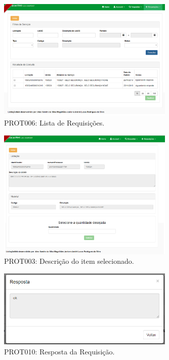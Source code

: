\begin{figure}[htp]
	\centering
	\includegraphics[width=0.75\textwidth]{figuras/prototipo006.png}
	\caption[PROT006: Lista de Requisições]{PROT006: Lista de Requisições.}
	\label{tela02}
\end{figure}

\begin{figure}[htp]
	\centering
	\includegraphics[width=0.75\textwidth]{figuras/prototipo003.png}
	\caption[PROT003: Descrição do item selecionado]{PROT003: Descrição do item selecionado.}
	\label{tela03}
\end{figure}

\begin{figure}[htp]
	\centering
	\includegraphics[width=0.75\textwidth]{figuras/prototipo010.png}
	\caption[PROT010: Resposta da Requisição]{PROT010: Resposta da Requisição.}
	\label{tela04}
\end{figure}


